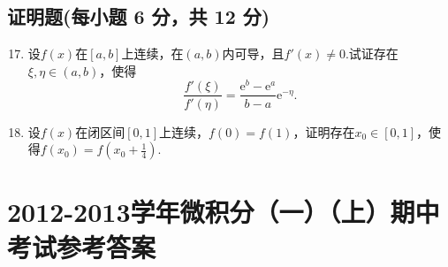 \documentclass[../main.tex]{subfiles}
\begin{document}
\section{证明题(每小题 6 分，共 12 分)}
\begin{enumerate}
    \setcounter{enumi}{16}
    \item 设$f(x)$在$[a,b]$上连续，在$(a,b)$内可导，且$f'(x)\neq0$.试证存在$\xi
              ,\eta\in(a,b)$，使得
          \[
              \frac{f'(\xi)}{f'(\eta)}=\frac{\mathrm{e}^{b}-\mathrm{e}^{a}}{b-a}\mathrm{e}
              ^{-\eta}.
          \]
          \vspace{12em}

    \item 设$f(x)$在闭区间$[0,1]$上连续，$f(0)=f(1)$，证明存在$x_{0}\in[0,1]$，使得$f
              (x_{0})=f\left(x_{0}+\frac{1}{4}\right)$.
          \vspace{12em}
\end{enumerate}

\chapter{2012-2013学年微积分（一）（上）期中考试参考答案}
\end{document}
